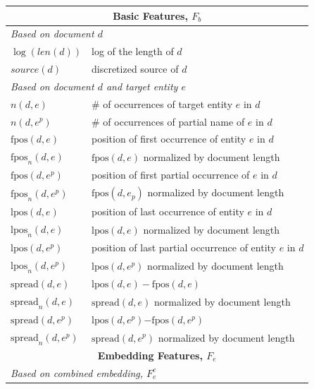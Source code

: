 \documentclass{article}
\begin{document}
\begin{table}[tb]
\center
{\small
\begin{tabular}{p{}p{}}
\toprule
\multicolumn{2}{c}{\textbf{Basic Features, $F_b$}} \\ %
\midrule
\multicolumn{2}{l}{\emph{Based on document $d$}} \\ %
$\log(len(d))$ & log of the length of $d$ \\ %
$source(d)$ & discretized source of $d$ \\
\multicolumn{2}{l}{\emph{Based on document $d$ and target entity $e$}} \\ %
$n(d,e)$ & \# of occurrences of target entity $e$ in $d$ \\
$n(d,e^p)$ & \# of occurrences of partial name of $e$ in $d$ \\
$\text{fpos}(d,e)$ & position of first occurrence of entity $e$ in $d$ \\
$\text{fpos}_n(d,e)$ & $\text{fpos}(d,e)$ normalized by document length \\
$\text{fpos}(d,e^p)$ & position of first partial occurrence of $e$ in $d$ \\
$\text{fpos}_n(d,e^p)$ & $\text{fpos}(d,e_p)$ normalized by document length \\
$\text{lpos}(d,e)$ & position of last occurrence of entity $e$ in $d$ \\
$\text{lpos}_n(d,e)$ & $\text{lpos}(d,e)$ normalized by document length \\
$\text{lpos}(d,e^p)$ & position of last partial occurrence of entity $e$ in $d$ \\
$\text{lpos}_n(d,e^p)$ & $\text{lpos}(d,e^p)$ normalized by document length \\ 
$\text{spread}(d,e)$ & $\text{lpos}(d,e) - \text{fpos}(d,e)$ \\
$\text{spread}_n(d,e)$ & $\text{spread}(d,e)$ normalized by document length \\
$\text{spread}(d,e^p)$ & $\text{lpos}(d,e^p)\mathord{-}\text{fpos}(d,e^p)$ \\
$\text{spread}_n(d,e^p)$ & $\text{spread}(d,e^p)$ normalized by document length \\ 
\midrule
\multicolumn{2}{c}{\textbf{Embedding Features, $F_e$}} \\ %
\midrule
\multicolumn{2}{l}{\emph{Based on combined embedding, $F_e^c$}} \\ %

\end{tabular}}
\end{table}
\end{document}
